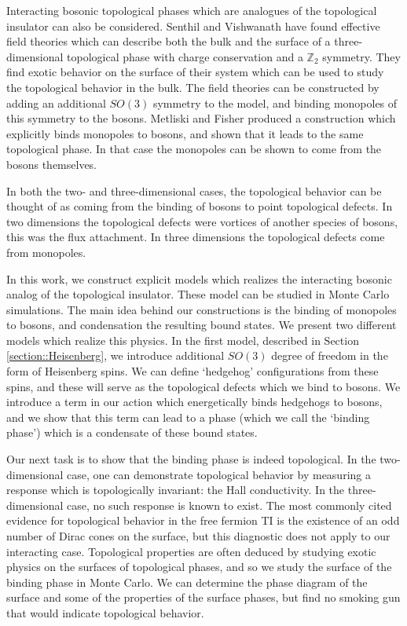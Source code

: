 \documentclass[prb,twocolumn]{revtex4-1}
\begin{document}
Interacting bosonic topological phases which are analogues of the topological insulator can also be considered. Senthil and Vishwanath\cite{SenthilVishwanath} have found effective field theories which can describe both the bulk and the surface of a three-dimensional topological phase with charge conservation and a $\mathbb{Z}_2$ symmetry. They find exotic behavior on the surface of their system which can be used to study the topological behavior in the bulk. The field theories can be constructed by adding an additional $SO(3)$ symmetry to the model, and binding monopoles of this symmetry to the bosons. Metliski and Fisher produced a construction which explicitly binds monopoles to bosons, and shown that it leads to the same topological phase. In that case the monopoles can be shown to come from the bosons themselves.\cite{Max} 

In both the two- and three-dimensional cases, the topological behavior can be thought of as coming from the binding of bosons to point topological defects. In two dimensions the topological defects were vortices of another species of bosons, this was the flux attachment. In three dimensions the topological defects come from monopoles.

In this work, we construct explicit models which realizes the interacting bosonic analog of the topological insulator. These model can be studied in Monte Carlo simulations. The main idea behind our constructions is the binding of monopoles to bosons, and condensation the resulting bound states. We present two different models which realize this physics. In the first model, described in Section \ref{section::Heisenberg}, we introduce additional $SO(3)$ degree of freedom in the form of Heisenberg spins. We can define `hedgehog' configurations from these spins, and these will serve as the topological defects which we bind to bosons. We introduce a term in our action which energetically binds hedgehogs to bosons, and we show that this term can lead to a phase (which we call the `binding phase') which is a condensate of these bound states.

Our next task is to show that the binding phase is indeed topological. In the two-dimensional case, one can demonstrate topological behavior by measuring a response which is topologically invariant: the Hall conductivity. In the three-dimensional case, no such response is known to exist. The most commonly cited evidence for topological behavior in the free fermion TI is the existence of an odd number of Dirac cones on the surface, but this diagnostic does not apply to our interacting case. Topological properties are often deduced by studying exotic physics on the surfaces of topological phases, and so we study the surface of the binding phase in Monte Carlo. We can determine the phase diagram of the surface and some of the properties of the surface phases, but find no smoking gun that would indicate topological behavior. 
\end{document}
